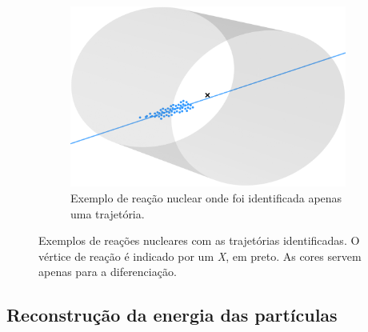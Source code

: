 \documentclass[a4paper,12pt,oneside]{book}
\begin{document}
\begin{figure}[H]
\begin{subfigure}[t]{0.45\textwidth}
        \includegraphics[scale=0.5, width=.95\columnwidth]{figs/results_ex_1_track_num_220.png}
        \caption{Exemplo de reação nuclear onde foi identificada apenas uma trajetória.}
        \label{subfig:res_exemplo_1_track}
    \end{subfigure}
\caption{Exemplos de reações nucleares com as trajetórias identificadas. O vértice de reação é indicado por um \textit{X}, em preto. As cores servem apenas para a diferenciação.}
\label{fig:res_tracks}
\end{figure}


\subsection{Reconstrução da energia das partículas}

\end{document}
